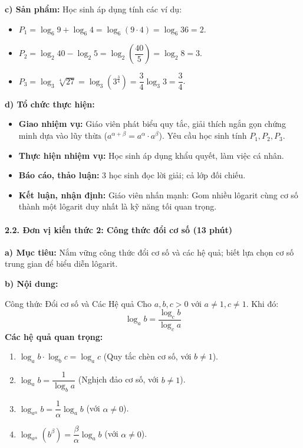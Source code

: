 \documentclass[12pt, a4paper]{article}
\begin{document}
\noindent \textbf{c) Sản phẩm:}
Học sinh áp dụng tính các ví dụ:
\begin{itemize}
    \item $P_1 = \log_6 9 + \log_6 4 = \log_6 (9 \cdot 4) = \log_6 36 = 2$.
    \item $P_2 = \log_2 40 - \log_2 5 = \log_2 \left(\dfrac{40}{5}\right) = \log_2 8 = 3$.
    \item $P_3 = \log_3 \sqrt[4]{27} = \log_3 (3^{\frac{3}{4}}) = \dfrac{3}{4} \log_3 3 = \dfrac{3}{4}$.
\end{itemize}

\noindent \textbf{d) Tổ chức thực hiện:}
\begin{itemize}[leftmargin=0.6cm]
    \item \textbf{Giao nhiệm vụ:} Giáo viên phát biểu quy tắc, giải thích ngắn gọn chứng minh dựa vào lũy thừa ($a^{\alpha+\beta} = a^\alpha \cdot a^\beta$). Yêu cầu học sinh tính $P_1, P_2, P_3$.
    \item \textbf{Thực hiện nhiệm vụ:} Học sinh áp dụng khẩu quyết, làm việc cá nhân.
    \item \textbf{Báo cáo, thảo luận:} 3 học sinh đọc lời giải; cả lớp đối chiếu.
    \item \textbf{Kết luận, nhận định:} Giáo viên nhấn mạnh: Gom nhiều lôgarit cùng cơ số thành một lôgarit duy nhất là kỹ năng tối quan trọng.
\end{itemize}

\paragraph{2.2. Đơn vị kiến thức 2: Công thức đổi cơ số (13 phút)}

\noindent \textbf{a) Mục tiêu:}
Nắm vững công thức đổi cơ số và các hệ quả; biết lựa chọn cơ số trung gian để biểu diễn lôgarit.

\noindent \textbf{b) Nội dung:}
\begin{pedabox}{Công thức Đổi cơ số và Các Hệ quả}
Cho $a, b, c > 0$ với $a \neq 1, c \neq 1$. Khi đó:
$$\log_a b = \dfrac{\log_c b}{\log_c a}$$
\textbf{Các hệ quả quan trọng:}
\begin{enumerate}[leftmargin=0.6cm]
    \item $\log_a b \cdot \log_b c = \log_a c$ (Quy tắc chèn cơ số, với $b \neq 1$).
    \item $\log_a b = \dfrac{1}{\log_b a}$ (Nghịch đảo cơ số, với $b \neq 1$).
    \item $\log_{a^\alpha} b = \dfrac{1}{\alpha} \log_a b$ (với $\alpha \neq 0$).
    \item $\log_{a^\alpha} (b^\beta) = \dfrac{\beta}{\alpha} \log_a b$ (với $\alpha \neq 0$).
\end{enumerate}
\end{pedabox}
\end{document}
